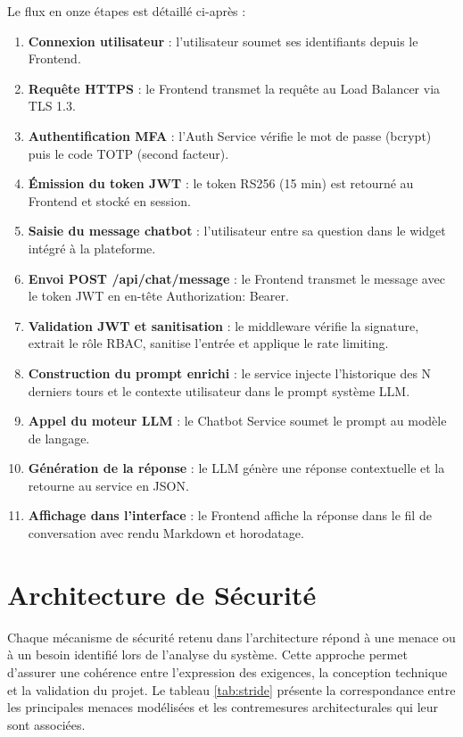 Le flux en onze étapes est détaillé ci-après :
\begin{enumerate}
    \item \textbf{Connexion utilisateur} : l'utilisateur soumet ses identifiants depuis le Frontend.
    \item \textbf{Requête HTTPS} : le Frontend transmet la requête au Load Balancer via TLS 1.3.
    \item \textbf{Authentification MFA} : l'Auth Service vérifie le mot de passe (bcrypt) puis le code TOTP (second facteur).
    \item \textbf{Émission du token JWT} : le token RS256 (15 min) est retourné au Frontend et stocké en session.
    \item \textbf{Saisie du message chatbot} : l'utilisateur entre sa question dans le widget intégré à la plateforme.
    \item \textbf{Envoi POST /api/chat/message} : le Frontend transmet le message avec le token JWT en en-tête Authorization: Bearer.
    \item \textbf{Validation JWT et sanitisation} : le middleware vérifie la signature, extrait le rôle RBAC, sanitise l'entrée et applique le rate limiting.
    \item \textbf{Construction du prompt enrichi} : le service injecte l'historique des N derniers tours et le contexte utilisateur dans le prompt système LLM.
    \item \textbf{Appel du moteur LLM} : le Chatbot Service soumet le prompt au modèle de langage.
    \item \textbf{Génération de la réponse} : le LLM génère une réponse contextuelle et la retourne au service en JSON.
    \item \textbf{Affichage dans l'interface} : le Frontend affiche la réponse dans le fil de conversation avec rendu Markdown et horodatage.
\end{enumerate}

\section{Architecture de Sécurité}
Chaque mécanisme de sécurité retenu dans l'architecture répond à une menace ou à un besoin identifié lors de l'analyse du système. Cette approche permet d'assurer une cohérence entre l'expression des exigences, la conception technique et la validation du projet. Le tableau \ref{tab:stride} présente la correspondance entre les principales menaces modélisées et les contremesures architecturales qui leur sont associées.

